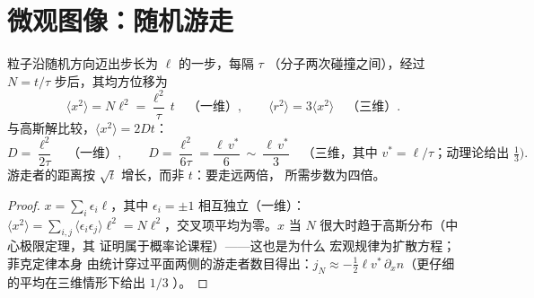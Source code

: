 \section{微观图像：随机游走}\label{sec:b2:particle-diffusion:microscopic}

\begin{proposition}[随机游走与扩散系数]\label{prop:b2:particle-diffusion:walk}
粒子沿随机方向迈出步长为 $\ell$ 的一步，每隔 $\tau$
（分子两次碰撞之间），经过 $N =
t/\tau$ 步后，其均方位移为
\[
\langle x^2\rangle = N\ell^2 = \frac{\ell^2}{\tau}\,t
\quad\text{（一维）}, \qquad
\langle r^2\rangle = 3\langle x^2\rangle \quad\text{（三维）}.
\]
与高斯解比较，$\langle x^2\rangle = 2Dt$：
\[
D = \frac{\ell^2}{2\tau} \quad\text{（一维）}, \qquad
D = \frac{\ell^2}{6\tau} = \frac{\ell\,v^*}{6}\ \sim\ \frac{\ell\,v^*}{3}
\quad\text{（三维，其中 } v^* = \ell/\tau\text{；动理论给出 } \tfrac13) .
\]
游走者的距离按 $\sqrt t$ 增长，而非 $t$：要走远两倍，
所需步数为四倍。
\end{proposition}

\begin{proof}
$x = \sum_i \epsilon_i\ell$，其中 $\epsilon_i = \pm1$ 相互独立（一维）：
$\langle x^2\rangle = \sum_{i,j}\langle\epsilon_i\epsilon_j\rangle\ell^2 =
N\ell^2$，交叉项平均为零。$x$
当 $N$ 很大时趋于高斯分布（中心极限定理，其
证明属于概率论课程）——这也是为什么
宏观规律为扩散方程；菲克定律本身
由统计穿过平面两侧的游走者数目得出：$j_N \approx
-\tfrac12\ell v^*\,\partial_x n$（更仔细的平均在三维情形下给出 $1/3$
）。
\end{proof}

